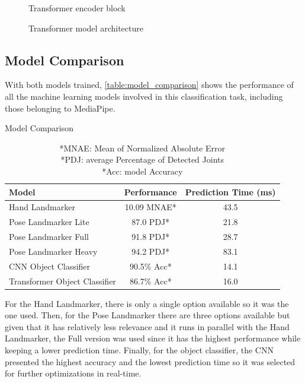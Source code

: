\begin{figure}[H] %
    \centering
    {\fontsize{10}{12}\selectfont}
    \caption{Transformer encoder block}
    \label{fig:transformer_encoder_architecture}
\end{figure}

\begin{figure}[H] %
    \centering
    {\fontsize{10}{12}\selectfont}
    \caption{Transformer model architecture}
    \label{fig:transformer_architecture}
\end{figure}

\subsection{Model Comparison}

With both models trained, \autoref{table:model_comparison} shows the performance of all the machine learning models involved in this classification task, including those belonging to MediaPipe.

\begin{table}[H] %
    \centering
    \caption{Model Comparison}
    \label{table:model_comparison}
    \begin{tabular}{lcc}
        \toprule
        Model & Performance & Prediction Time (ms) \\
        \midrule
        Hand Landmarker & 10.09 MNAE* & 43.5 \\
        Pose Landmarker Lite & 87.0 PDJ* & 21.8 \\
        Pose Landmarker Full & 91.8 PDJ* & 28.7 \\
        Pose Landmarker Heavy & 94.2 PDJ* & 83.1 \\
        CNN Object Classifier & 90.5\% Acc* & 14.1 \\
        Transformer Object Classifier & 86.7\% Acc* & 16.0 \\
        \bottomrule
    \end{tabular}
    \captionsetup{width=0.9\textwidth}
    \caption*{*MNAE: Mean of Normalized Absolute Error\\ *PDJ: average Percentage of Detected Joints\\ *Acc: model Accuracy}
\end{table}

For the Hand Landmarker, there is only a single option available so it was the one used. Then, for the Pose Landmarker there are three options available but given that it has relatively less relevance and it runs in parallel with the Hand Landmarker, the Full version was used since it has the highest performance while keeping a lower prediction time. Finally, for the object classifier, the CNN presented the highest accuracy and the lowest prediction time so it was selected for further optimizations in real-time.

